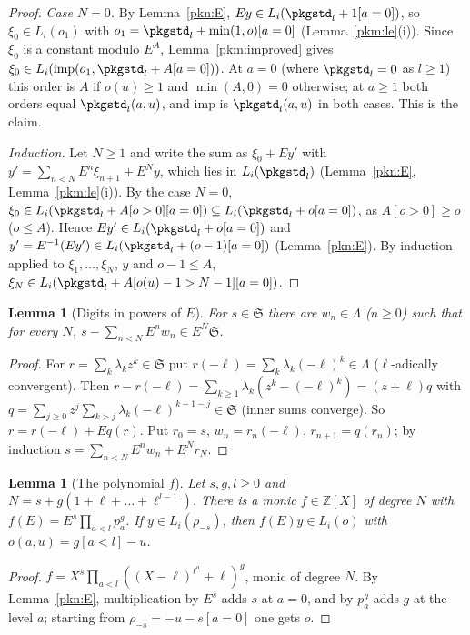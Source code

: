 \documentclass[10pt]{amsart}
\newtheorem{lemma}[theorem]{Lemma}
\theoremstyle{definition}
\theoremstyle{remark}
\newcommand{\Z}{\mathbb Z}
\begin{document}
\begin{proof}
\emph{Case $N=0$.} By Lemma~\ref{pkn:E}, $Ey\in L_i(\pkgstd_l+1[a=0])$, so $\xi_0\in L_i(o_1)$ with
$o_1=\pkgstd_l+\min(1,o)[a=0]$ (Lemma~\ref{pkm:le}(i)). Since $\xi_0$ is a constant modulo $E^A$,
Lemma~\ref{pkm:improved} gives $\xi_0\in L_i(\mathrm{imp}(o_1,\pkgstd_l+A[a=0]))$. At $a=0$ (where
$\pkgstd_l=0$ as $l\ge1$) this order is $A$ if $o(u)\ge1$ and $\min(A,0)=0$ otherwise; at $a\ge1$ both
orders equal $\pkgstd_l(a,u)$, and $\mathrm{imp}$ is $\pkgstd_l(a,u)$ in both cases. This is the claim.

\emph{Induction.} Let $N\ge1$ and write the sum as $\xi_0+Ey'$ with $y'=\sum_{n<N}E^n\xi_{n+1}+E^Ny$, which
lies in $L_i(\pkgstd_l)$ (Lemma~\ref{pkn:E}, Lemma~\ref{pkm:le}(i)). By the case $N=0$, $\xi_0\in
L_i(\pkgstd_l+A[o>0][a=0])\subseteq L_i(\pkgstd_l+o[a=0])$, as $A[o>0]\ge o$ ($o\le A$). Hence
$Ey'\in L_i(\pkgstd_l+o[a=0])$ and $y'=E^{-1}(Ey')\in L_i(\pkgstd_l+(o-1)[a=0])$ (Lemma~\ref{pkn:E}). By
induction applied to $\xi_1,\dots,\xi_N$, $y$ and $o-1\le A$, $\xi_N\in L_i(\pkgstd_l+A[o(u)-1>N-1][a=0])$.
\end{proof}

\begin{lemma}[Digits in powers of $E$]\label{pkg:digits}
For $s\in\mathfrak S$ there are $w_n\in\Lambda$ ($n\ge0$) such that for every $N$,
$s-\sum_{n<N}E^nw_n\in E^N\mathfrak S$.
\end{lemma}

\begin{proof}
For $r=\sum_k\lambda_kz^k\in\mathfrak S$ put $r(-\ell)=\sum_k\lambda_k(-\ell)^k\in\Lambda$ ($\ell$-adically
convergent). Then $r-r(-\ell)=\sum_{k\ge1}\lambda_k(z^k-(-\ell)^k)=(z+\ell)q$ with
$q=\sum_{j\ge0}z^j\sum_{k>j}\lambda_k(-\ell)^{k-1-j}\in\mathfrak S$ (inner sums converge). So
$r=r(-\ell)+Eq(r)$. Put $r_0=s$, $w_n=r_n(-\ell)$, $r_{n+1}=q(r_n)$; by induction
$s=\sum_{n<N}E^nw_n+E^Nr_N$.
\end{proof}

\begin{lemma}[The polynomial $f$]\label{pkg:f}
Let $s,g,l\ge0$ and $N=s+g(1+\ell+\dots+\ell^{l-1})$. There is a monic $f\in\Z[X]$ of degree $N$ with
$f(E)=E^s\prod_{a<l}p_a^g$. If $y\in L_i(\rho_{-s})$, then $f(E)y\in L_i(o)$ with $o(a,u)=g[a<l]-u$.
\end{lemma}

\begin{proof}
$f=X^s\prod_{a<l}((X-\ell)^{\ell^a}+\ell)^g$, monic of degree $N$. By Lemma~\ref{pkn:E}, multiplication by
$E^s$ adds $s$ at $a=0$, and by $p_a^g$ adds $g$ at the level $a$; starting from $\rho_{-s}=-u-s[a=0]$
one gets $o$.
\end{proof}
\end{document}
